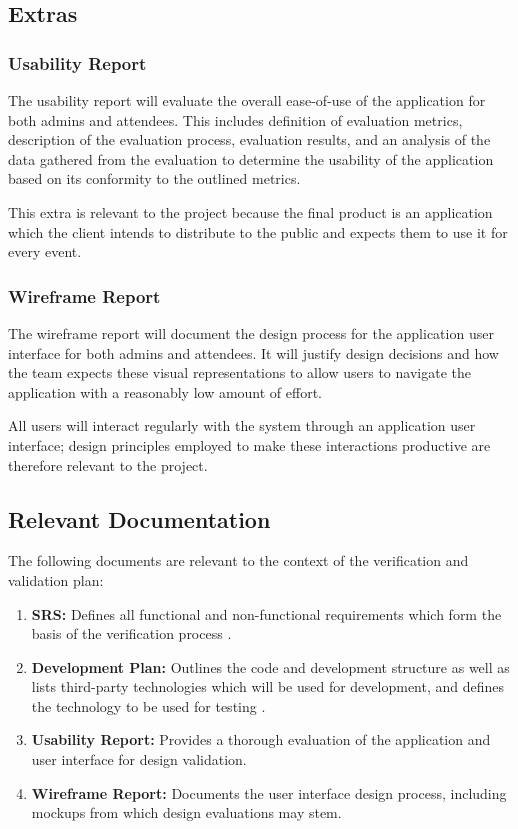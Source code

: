 \documentclass[12pt, titlepage]{article}
\begin{document}
\subsection{Extras}

\subsubsection{Usability Report}
The usability report will evaluate the overall ease-of-use of the application for both admins and attendees. This
includes definition of evaluation metrics, description of the evaluation process, evaluation results, and an analysis of
the data gathered from the evaluation to determine the usability of the application based on its conformity to the
outlined metrics.

This extra is relevant to the project because the final product is an application which the client
intends to distribute to the public and expects them to use it for every event.

\subsubsection{Wireframe Report}
The wireframe report will document the design process for the application user interface for both admins and attendees.
It will justify design decisions and how the team expects these visual representations to allow users to navigate the
application with a reasonably low amount of effort.

All users will interact regularly with the system through an application user interface; design principles employed to
make these interactions productive are therefore relevant to the project.

\subsection{Relevant Documentation}
The following documents are relevant to the context of the verification and validation plan:
\begin{enumerate}[align=left,
  leftmargin=*,
  labelsep=1em,
  itemindent=0em, font=\bfseries]
  \item {\bfseries SRS:} Defines all functional and non-functional requirements which form the basis of the verification
    process \citep{SRS}.
  \item {\bfseries Development Plan:} Outlines the code and development structure as well as lists third-party
    technologies which will be used for development, and defines the technology to be used for testing \citep{DVP}.
  \item {\bfseries Usability Report:} Provides a thorough evaluation of the application and user interface for design
    validation.
  \item {\bfseries Wireframe Report:} Documents the user interface design process, including mockups from which design
    evaluations may stem.
\end{enumerate}
\end{document}
